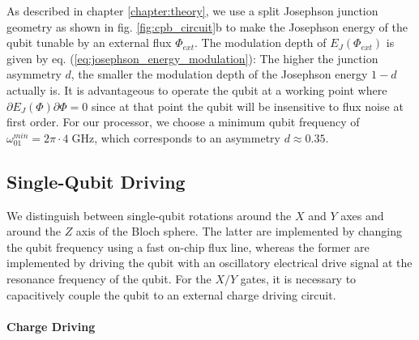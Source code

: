 \smallskip

As described in chapter \ref{chapter:theory}, we use a split Josephson junction geometry as shown in fig. \ref{fig:cpb_circuit}b to make the Josephson energy of the qubit tunable by an external flux $\Phi_{ext}$. The modulation depth of $E_J(\Phi_{ext})$ is given by eq. (\ref{eq:josephson_energy_modulation}): The higher the junction asymmetry $d$, the smaller the modulation depth of the Josephson energy $1-d$ actually is. It is advantageous to operate the qubit at a working point where $\partial E_J(\Phi)\partial \Phi=0$ since at that point the qubit will be insensitive to flux noise at first order. For our processor, we choose a minimum qubit frequency of $\omega_{01}^{min}=2\pi\cdot 4\;\mathrm{GHz}$, which corresponds to an asymmetry $d\approx 0.35$.

\subsection{Single-Qubit Driving}

We distinguish between single-qubit rotations around the $X$ and $Y$ axes and around the $Z$ axis of the Bloch sphere. The latter are implemented by changing the qubit frequency using a fast on-chip flux line, whereas the former are implemented by driving the qubit with an oscillatory electrical drive signal at the resonance frequency of the qubit. For the $X/Y$ gates, it is necessary to capacitively couple the qubit to an external charge driving circuit. 

\paragraph{Charge Driving}

